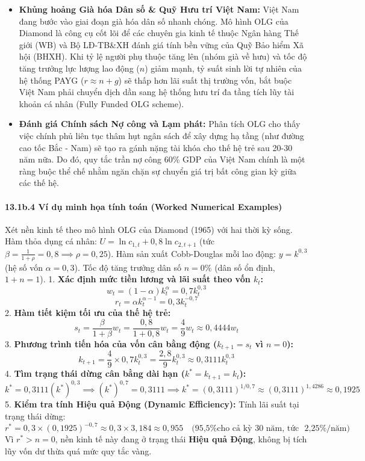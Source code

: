 \documentclass[
]{article}
\providecommand{\tightlist}{%
  \setlength{\itemsep}{0pt}\setlength{\parskip}{0pt}}
\begin{document}
\begin{itemize}
\tightlist
\item
  \textbf{Khủng hoảng Già hóa Dân số \& Quỹ Hưu trí Việt Nam:} Việt Nam
  đang bước vào giai đoạn già hóa dân số nhanh chóng. Mô hình OLG của
  Diamond là công cụ cốt lõi để các chuyên gia kinh tế thuộc Ngân hàng
  Thế giới (WB) và Bộ LĐ-TB\&XH đánh giá tính bền vững của Quỹ Bảo hiểm
  Xã hội (BHXH). Khi tỷ lệ người phụ thuộc tăng lên (nhóm già về hưu) và
  tốc độ tăng trưởng lực lượng lao động (\(n\)) giảm mạnh, tỷ suất sinh
  lời tự nhiên của hệ thống PAYG (\(r \approx n + g\)) sẽ thấp hơn lãi
  suất thị trường vốn, bắt buộc Việt Nam phải chuyển dịch dần sang hệ
  thống hưu trí đa tầng tích lũy tài khoản cá nhân (Fully Funded OLG
  scheme).
\item
  \textbf{Đánh giá Chính sách Nợ công và Lạm phát:} Phân tích OLG cho
  thấy việc chính phủ liên tục thâm hụt ngân sách để xây dựng hạ tầng
  (như đường cao tốc Bắc - Nam) sẽ tạo ra gánh nặng tài khóa cho thế hệ
  trẻ sau 20-30 năm nữa. Do đó, quy tắc trần nợ công 60\% GDP của Việt
  Nam chính là một ràng buộc thể chế nhằm ngăn chặn sự chuyển giá trị
  bất công gian kỳ giữa các thế hệ.
\end{itemize}

\paragraph{13.1b.4 Ví dụ minh họa tính toán (Worked Numerical
Examples)}\label{b.4-vuxed-dux1ee5-minh-hux1ecda-tuxednh-touxe1n-worked-numerical-examples}

Xét nền kinh tế theo mô hình OLG của Diamond (1965) với hai thời kỳ
sống. Hàm thỏa dụng cá nhân: \(U = \ln c_{1,t} + 0,8 \ln c_{2,t+1}\)
(tức \(\beta = \frac{1}{1+\rho} = 0,8 \implies \rho = 0,25\)). Hàm sản
xuất Cobb-Douglas mỗi lao động: \(y = k^{0,3}\) (hệ số vốn
\(\alpha = 0,3\)). Tốc độ tăng trưởng dân số \(n = 0\%\) (dân số ổn
định, \(1+n = 1\)). 1. \textbf{Xác định mức tiền lương và lãi suất theo
vốn \(k_t\):} \[w_t = (1 - \alpha) k_t^\alpha = 0,7 k_t^{0,3}\]
\[r_t = \alpha k_t^{\alpha - 1} = 0,3 k_t^{-0,7}\] 2. \textbf{Hàm tiết
kiệm tối ưu của thế hệ trẻ:}
\[s_t = \frac{\beta}{1 + \beta} w_t = \frac{0,8}{1 + 0,8} w_t = \frac{4}{9} w_t \approx 0,4444 w_t\]
3. \textbf{Phương trình tiến hóa của vốn cân bằng động
(\(k_{t+1} = s_t\) vì \(n=0\)):}
\[k_{t+1} = \frac{4}{9} \times 0,7 k_t^{0,3} = \frac{2,8}{9} k_t^{0,3} \approx 0,3111 k_t^{0,3}\]
4. \textbf{Tìm trạng thái dừng cân bằng dài hạn
(\(k^* = k_{t+1} = k_t\)):}
\[k^* = 0,3111 (k^*)^{0,3} \implies (k^*)^{0,7} = 0,3111 \implies k^* = (0,3111)^{1/0,7} \approx (0,3111)^{1,4286} \approx 0,1925\]
5. \textbf{Kiểm tra tính Hiệu quả Động (Dynamic Efficiency):} Tính lãi
suất tại trạng thái dừng:
\[r^* = 0,3 \times (0,1925)^{-0,7} \approx 0,3 \times 3,184 \approx 0,955 \quad \text{(95,5\% cho cả kỳ 30 năm, tức ~2,25\%/năm)}\]
Vì \(r^* > n = 0\), nền kinh tế này đang ở trạng thái \textbf{Hiệu quả
Động}, không bị tích lũy vốn dư thừa quá mức quy tắc vàng.
\end{document}
